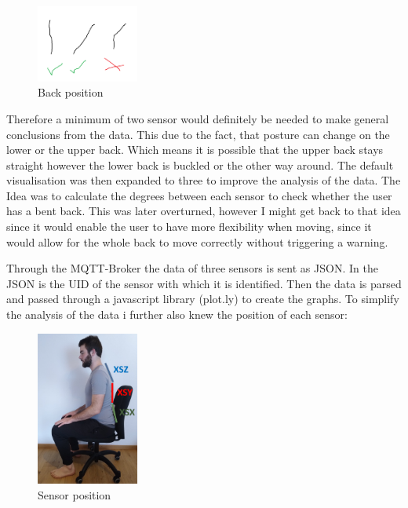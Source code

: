 \begin{figure}[ht]
  \begin{center}
\includegraphics[width=0.3\textwidth]{images/Backposition.png}
  \end{center}
  \caption{Back position}
  \label{fig:BackPos}
\end{figure}

Therefore a minimum of two sensor would definitely be needed to make general conclusions from the data. This due to the fact, that posture can change on the lower or the upper back. Which means it is possible that the upper back stays straight however the lower back is buckled or the other way around. 
The default visualisation was then expanded to three to improve the analysis of the data.  The Idea was to calculate the degrees between each sensor to check whether the user has a bent back. This was later overturned, however I might get back to that idea since it would enable the user to have more flexibility when moving, since it would allow for the whole back to move correctly without triggering a warning.

Through the MQTT-Broker the data of three sensors is sent as JSON. In the JSON is the UID of the sensor with which it is identified. Then the data is parsed and passed through a javascript library (plot.ly) \cite{ModernAn18:online} to create the graphs. To simplify the analysis of the data i further also knew the position of each sensor:

\begin{figure}[ht]
  \begin{center}
\includegraphics[width=0.3\textwidth]{images/ChairVisualised.png}
  \end{center}
  \caption{Sensor position}
  \label{fig:SensorPos}
\end{figure}

